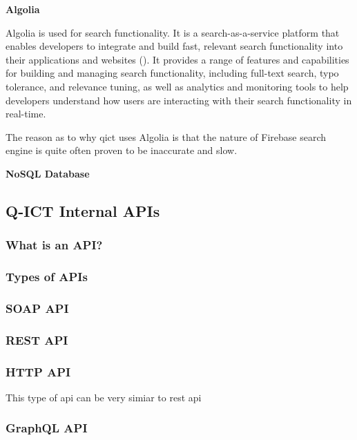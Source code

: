 \begin{multicols}{2}
      \textbf{Algolia}

      Algolia is used for search functionality. It is a search-as-a-service platform that enables developers to
      integrate and build fast, relevant search functionality into their applications and websites (\cite{algolia}).
      It provides a range of features and capabilities for building and managing search functionality, including
      full-text search, typo tolerance, and relevance tuning, as well as analytics and monitoring tools to help
      developers understand how users are interacting with their search functionality in real-time.

      The reason as to why \acrshort{qict} uses Algolia is that the nature of Firebase search engine is quite often
      proven to be inaccurate and slow.

      \textbf{NoSQL Database}

      \subsection{Q-ICT Internal APIs}
      \subsubsection{What is an API?}

      \subsubsection{Types of APIs}\label{chap:typesofapis}
      \subsubsection{SOAP API}
      \subsubsection{REST API}
      \subsubsection{HTTP API}
      This type of \acrshort{api} can be very simiar to \acrshort{rest} \acrshort{api}
      \subsubsection{GraphQL API}


\end{multicols}
